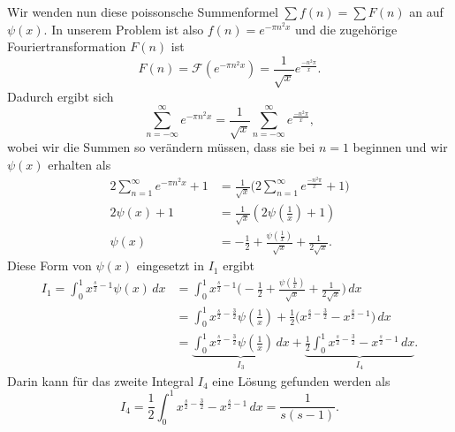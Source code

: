 Wir wenden nun diese poissonsche Summenformel $\sum f(n) = \sum F(n)$ an auf $\psi(x)$.
In unserem Problem ist also $f(n) =  e^{-\pi n^2 x}$ und die zugehörige Fouriertransformation $F(n)$ ist
\begin{equation}
    F(n)
    =
    \mathcal{F}
    (
    e^{-\pi n^2 x}
    )
    =
    \frac{1}{\sqrt{x}}
    e^{\frac{-n^2 \pi}{x}}.
\end{equation}
Dadurch ergibt sich
\begin{equation}\label{zeta:equation:psi}
    \sum_{n=-\infty}^{\infty}
    e^{-\pi n^2 x}
    =
    \frac{1}{\sqrt{x}}
    \sum_{n=-\infty}^{\infty}
    e^{\frac{-n^2 \pi}{x}},
\end{equation}
wobei wir die Summen so verändern müssen, dass sie bei $n=1$ beginnen und wir $\psi(x)$ erhalten als
\begin{align}
    2
    \sum_{n=1}^{\infty}
    e^{-\pi n^2 x}
    +
    1
    &=
    \frac{1}{\sqrt{x}}
    \Biggl(
    2
    \sum_{n=1}^{\infty}
    e^{\frac{-n^2 \pi}{x}}
    +
    1
    \Biggr)
    \\
    2
    \psi(x)
    +
    1
    &=
    \frac{1}{\sqrt{x}}
    \left(
    2
    \psi\left(\frac{1}{x}\right)
    +
    1
    \right)
    \\
    \psi(x)
    &=
    - \frac{1}{2}
    + \frac{\psi\left(\frac{1}{x} \right)}{\sqrt{x}}
    + \frac{1}{2 \sqrt{x}}.\label{zeta:equation:psi}
\end{align}
Diese Form von $\psi(x)$ eingesetzt in $I_1$ ergibt
\begin{align}
    I_1
    =
    \int_0^{1}
    x^{\frac{s}{2}-1}
    \psi(x)
    \,dx
    &=
    \int_0^{1}
    x^{\frac{s}{2}-1}
    \Biggl(
    - \frac{1}{2}
    + \frac{\psi\left(\frac{1}{x} \right)}{\sqrt{x}}
    + \frac{1}{2 \sqrt{x}}
    \Biggr)
    \,dx
    \\
    &=
    \int_0^{1}
    x^{\frac{s}{2}-\frac{3}{2}}
    \psi \left( \frac{1}{x} \right)
    + \frac{1}{2}
    \biggl(
    x^{\frac{s}{2}-\frac{3}{2}}
    -
    x^{\frac{s}{2}-1}
    \biggl)
    \,dx
    \\
    &=
    \underbrace{
    \int_0^{1}
    x^{\frac{s}{2}-\frac{3}{2}}
    \psi \left( \frac{1}{x} \right)
    \,dx
    }_{I_3}
    +
    \underbrace{
    \frac{1}{2}
    \int_0^1
    x^{\frac{s}{2}-\frac{3}{2}}
    -
    x^{\frac{s}{2}-1}
    \,dx
    }_{I_4}. \label{zeta:equation:integral3}
\end{align}
Darin kann für das zweite Integral $I_4$ eine Lösung gefunden werden als
\begin{equation}
    I_4
    =
    \frac{1}{2}
    \int_0^1
    x^{\frac{s}{2}-\frac{3}{2}}
    -
    x^{\frac{s}{2}-1}
    \,dx
    =
    \frac{1}{s(s-1)}.
\end{equation}
